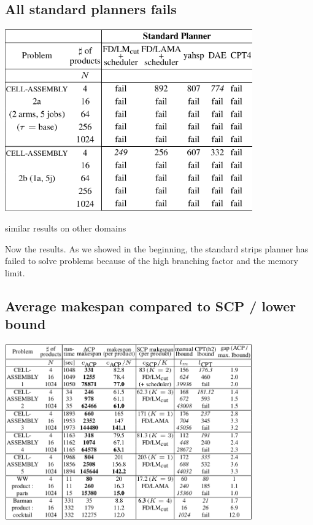 \subsection{All standard planners fails}
\label{sec-9-3}
\includegraphics[width=0.8\textwidth]{img/no-other-existing-planner.png}

similar results on other domains

\begin{resume}
Now the results.
As we showed in the beginning,
the standard strips planner has failed to
solve problems because of the high branching factor and the memory limit.
\end{resume}

\subsection{Average makespan compared to SCP / lower bound}
\label{sec-9-4}
\includegraphics[width=0.8\textwidth]{img/static/results-poster.png}

